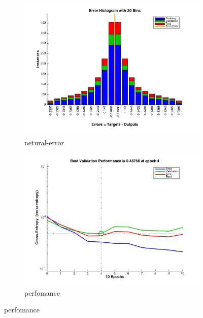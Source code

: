 \documentclass[]{article}
\begin{document}
\begin{figure}[p]
	\centering
	\begin{subfigure}{.5\textwidth}
		\centering
		\includegraphics[width=1\linewidth]{../images-update/1-(4)-netural-error.png}
		\caption{netural-error}
		\label{fig:sub1}
	\end{subfigure}
	
	\begin{subfigure}{.5\textwidth}
		\centering
		\includegraphics[width=1\linewidth]{../images-update/1-(4)-neural-perfomance.png}
		\caption{perfomance}
		\label{fig:sub1}
	\end{subfigure}
	

\end{figure}
\end{document}

